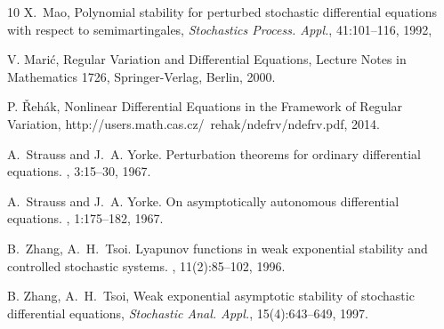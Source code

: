 \documentclass[a4paper,10pt,reqno]{amsart}
\numberwithin{equation}{section}
\theoremstyle{definition}
\theoremstyle{remark}
\DeclareMathOperator{\1}{\mathbbm 1}
\begin{document}
\begin{thebibliography}{10}
		X.~Mao, Polynomial stability for perturbed stochastic differential
		equations with respect to semimartingales, {\em Stochastics Process. Appl.}, 41:101--116, 1992,
		
		V. Mari\'c, Regular Variation and Differential Equations, Lecture Notes in Mathematics 1726,
		Springer-Verlag, Berlin, 2000.
		
		P. \v{R}eh\'ak, Nonlinear Differential Equations in the Framework of Regular Variation,
		http://users.math.cas.cz/~rehak/ndefrv/ndefrv.pdf, 2014.
		
		A.~Strauss and J.~A. Yorke.
		\newblock Perturbation theorems for ordinary differential equations.
		, 3:15--30, 1967.
		
		A.~Strauss and J.~A. Yorke.
		\newblock On asymptotically autonomous differential equations.
		, 1:175--182, 1967.
		
		B.~Zhang, A.~H.~Tsoi.
		\newblock Lyapunov functions in weak exponential stability and
		controlled stochastic systems.
		, 11(2):85--102, 1996.
		
		B. Zhang, A.~H.~Tsoi, Weak exponential asymptotic stability of
		stochastic differential equations, {\em Stochastic Anal. Appl.}, 15(4):643--649, 1997.
	\end{thebibliography}
	
	
\end{document}
